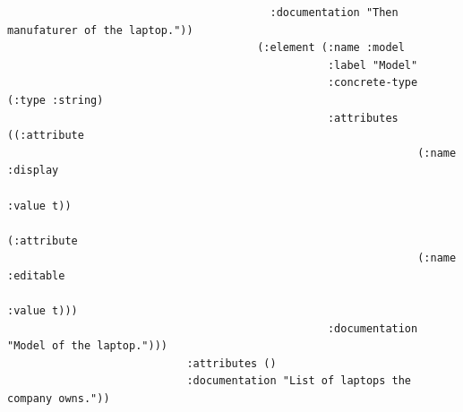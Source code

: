 \documentclass[11pt]{article}
\begin{document}
\begin{verbatim}
                                         :documentation "Then manufaturer of the laptop."))
                                       (:element (:name :model
                                                  :label "Model"
                                                  :concrete-type (:type :string)
                                                  :attributes ((:attribute
                                                                (:name :display
                                                                 :value t))
                                                               (:attribute
                                                                (:name :editable
                                                                 :value t)))
                                                  :documentation "Model of the laptop.")))
                            :attributes ()
                            :documentation "List of laptops the company owns."))


\end{verbatim}
\end{document}
